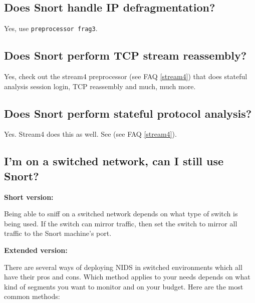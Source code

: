 \documentclass{article}
\newcommand{\myref}[1]{(see FAQ \ref{#1})}
\begin{document}
	
\subsection{Does Snort handle IP defragmentation?}

Yes, use {\tt preprocessor frag3}.

\subsection{Does Snort perform TCP stream reassembly?}

Yes, check out the stream4 preprocessor \myref{stream4} that does stateful 
analysis session login, TCP reassembly and much, much more.

\subsection{Does Snort perform stateful protocol analysis?}

Yes. Stream4 does this as well. See \myref{stream4}.

\subsection{I'm on a switched network, can I still use Snort?}

{\bf Short version:}

Being able to sniff on a switched network depends on what type of switch is
being used. If the switch can mirror traffic, then set the switch to mirror all
traffic to the Snort machine's port.

{\bf Extended version:}

There are several ways of deploying NIDS in switched environments which all
have their pros and cons. Which method applies to your needs depends on what
kind of segments you want to monitor and on your budget. Here are the most
common methods:
\end{document}
